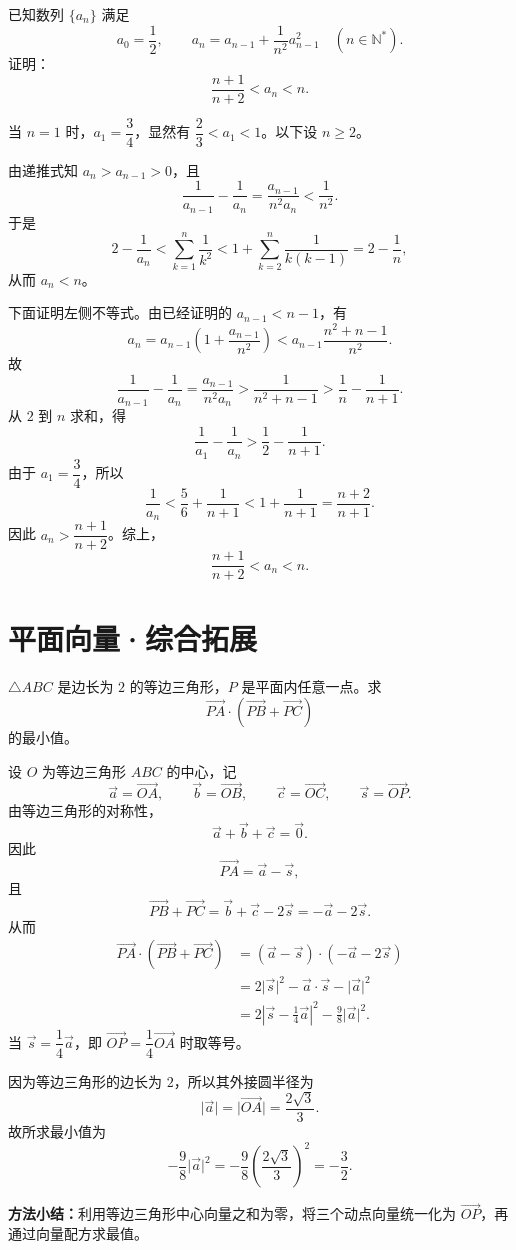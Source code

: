 \documentclass[zihao=-4]{exam-zh}
\begin{document}
\begin{question}[points=12]
已知数列 $\{a_n\}$ 满足
\[
 a_0=\frac12,\qquad a_n=a_{n-1}+\frac1{n^2}a_{n-1}^2\quad(n\in\mathbb N^*).
\]
证明：
\[
 \frac{n+1}{n+2}<a_n<n.
\]
\begin{solution}
当 $n=1$ 时，$a_1=\dfrac34$，显然有 $\dfrac23<a_1<1$。以下设 $n\ge2$。

由递推式知 $a_n>a_{n-1}>0$，且
\[
 \frac1{a_{n-1}}-\frac1{a_n}
 =\frac{a_{n-1}}{n^2a_n}<\frac1{n^2}.
\]
于是
\[
 2-\frac1{a_n}
 <\sum_{k=1}^{n}\frac1{k^2}
 <1+\sum_{k=2}^{n}\frac1{k(k-1)}
 =2-\frac1n,
\]
从而 $a_n<n$。

下面证明左侧不等式。由已经证明的 $a_{n-1}<n-1$，有
\[
 a_n=a_{n-1}\left(1+\frac{a_{n-1}}{n^2}\right)
 <a_{n-1}\frac{n^2+n-1}{n^2}.
\]
故
\[
 \frac1{a_{n-1}}-\frac1{a_n}
 =\frac{a_{n-1}}{n^2a_n}
 >\frac1{n^2+n-1}
 >\frac1n-\frac1{n+1}.
\]
从 $2$ 到 $n$ 求和，得
\[
 \frac1{a_1}-\frac1{a_n}>\frac12-\frac1{n+1}.
\]
由于 $a_1=\dfrac34$，所以
\[
 \frac1{a_n}<\frac56+\frac1{n+1}<1+\frac1{n+1}=\frac{n+2}{n+1}.
\]
因此 $a_n>\dfrac{n+1}{n+2}$。综上，
\[
 \boxed{\dfrac{n+1}{n+2}<a_n<n}.
\]
\end{solution}
\end{question}

\section{平面向量·综合拓展}

\begin{question}
$\triangle ABC$ 是边长为 $2$ 的等边三角形，$P$ 是平面内任意一点。求
\[
  \overrightarrow{PA}\cdot
  \left(\overrightarrow{PB}+\overrightarrow{PC}\right)
\]
的最小值。

\begin{solution}
设 $O$ 为等边三角形 $ABC$ 的中心，记
\[
 \vec a=\overrightarrow{OA},\qquad
 \vec b=\overrightarrow{OB},\qquad
 \vec c=\overrightarrow{OC},\qquad
 \vec s=\overrightarrow{OP}.
\]
由等边三角形的对称性，
\[
 \vec a+\vec b+\vec c=\vec 0.
\]
因此
\[
 \overrightarrow{PA}=\vec a-\vec s,
\]
且
\[
 \overrightarrow{PB}+\overrightarrow{PC}
 =\vec b+\vec c-2\vec s
 =-\vec a-2\vec s.
\]
从而
\begin{align*}
 \overrightarrow{PA}\cdot
 \left(\overrightarrow{PB}+\overrightarrow{PC}\right)
 &= (\vec a-\vec s)\cdot(-\vec a-2\vec s)\\
 &=2\lvert\vec s\rvert^2-\vec a\cdot\vec s-
   \lvert\vec a\rvert^2\\
 &=2\left\lvert\vec s-\frac14\vec a\right\rvert^2
   -\frac98\lvert\vec a\rvert^2.
\end{align*}
当 $\vec s=\dfrac14\vec a$，即
$\overrightarrow{OP}=\dfrac14\overrightarrow{OA}$ 时取等号。

因为等边三角形的边长为 $2$，所以其外接圆半径为
\[
 \lvert\vec a\rvert=\lvert\overrightarrow{OA}\rvert
 =\frac{2\sqrt3}{3}.
\]
故所求最小值为
\[
 -\frac98\lvert\vec a\rvert^2
 =-\frac98\left(\frac{2\sqrt3}{3}\right)^2
 =\boxed{-\frac32}.
\]

\textbf{方法小结：}利用等边三角形中心向量之和为零，将三个动点向量统一化为 $\overrightarrow{OP}$，再通过向量配方求最值。
\end{solution}
\end{question}
\end{document}
